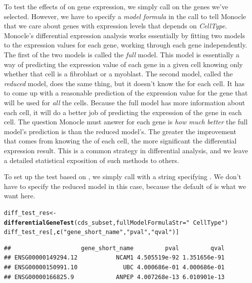 \documentclass[10pt,oneside]{article}\usepackage[]{graphicx}\usepackage[]{color}
\makeatletter
\newcommand{\hlstr}[1]{\textcolor[rgb]{0.192,0.494,0.8}{#1}}%
\newcommand{\hlstd}[1]{\textcolor[rgb]{0.345,0.345,0.345}{#1}}%
\newcommand{\hlkwb}[1]{\textcolor[rgb]{0.69,0.353,0.396}{#1}}%
\newcommand{\hlkwc}[1]{\textcolor[rgb]{0.333,0.667,0.333}{#1}}%
\newcommand{\hlkwd}[1]{\textcolor[rgb]{0.737,0.353,0.396}{\textbf{#1}}}%
\newenvironment{kframe}{%
 \def\at@end@of@kframe{}%
 \ifinner\ifhmode%
  \def\at@end@of@kframe{\end{minipage}}%
  \begin{minipage}{\columnwidth}%
 \fi\fi%
 \def\FrameCommand##1{\hskip\@totalleftmargin \hskip-\fboxsep
 \colorbox{shadecolor}{##1}\hskip-\fboxsep
     \hskip-\linewidth \hskip-\@totalleftmargin \hskip\columnwidth}%
 \MakeFramed {\advance\hsize-\width
   \@totalleftmargin\z@ \linewidth\hsize
   \@setminipage}}%
 {\par\unskip\endMakeFramed%
 \at@end@of@kframe}
\newenvironment{knitrout}{}{} %
\makeatother
\begin{document}
To test the effects of  on gene expression, we simply call  on the genes we've selected. However, we have to specify a \emph{model formula} in the call to tell Monocle that we care about genes with expression levels that depends on \emph{CellType}.  Monocle's differential expression analysis works essentially by fitting two models to the expression values for each gene, working through each gene independently.  The first of the two models is called the \emph{full} model.  This model is essentially a way of predicting the expression value of each gene in a given cell knowing only whether that cell is a fibroblast or a myoblast.  The second model, called the \emph{reduced} model, does the same thing, but it doesn't know the  for each cell.  It has to come up with a reasonable prediction of the expression value for the gene that will be used for \emph{all} the cells. Because the full model has more information about each cell, it will do a better job of predicting the expression of the gene in each cell.  The question Monocle must answer for each gene is \emph{how much better} the full model's prediction is than the reduced model's. The greater the improvement that comes from knowing the  of each cell, the more significant the differential expression result. This is a common strategy in differential analysis, and we leave a detailed statistical exposition of such methods to others.

To set up the test based on , we simply call  with a string specifying .  We don't have to specify the reduced model in this case, because the default of  is what we want here.

\begin{knitrout}
\color{fgcolor}\begin{kframe}
\begin{alltt}
\hlstd{diff_test_res} \hlkwb{<-} \hlkwd{differentialGeneTest}\hlstd{(cds_subset,} \hlkwc{fullModelFormulaStr}\hlstd{=}\hlstr{"~CellType"}\hlstd{)}
\hlstd{diff_test_res[,}\hlkwd{c}\hlstd{(}\hlstr{"gene_short_name"}\hlstd{,} \hlstr{"pval"}\hlstd{,} \hlstr{"qval"}\hlstd{)]}
\end{alltt}
\begin{verbatim}
##                    gene_short_name         pval         qval
## ENSG00000149294.12           NCAM1 4.505519e-92 1.351656e-91
## ENSG00000150991.10             UBC 4.000686e-01 4.000686e-01
## ENSG00000166825.9            ANPEP 4.007268e-13 6.010901e-13
\end{verbatim}
\end{kframe}
\end{knitrout}
\end{document}
